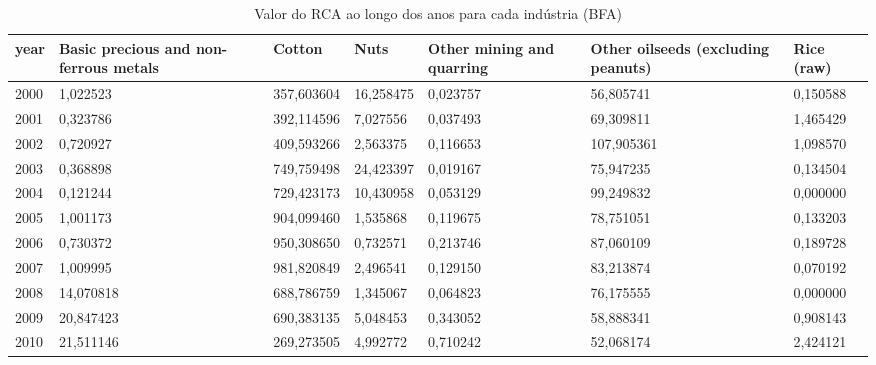 \begin{table}
\centering
\caption{Valor do RCA ao longo dos anos para cada indústria (BFA)}
\begin{tabular}{p{1cm}p{2cm}p{2cm}p{2cm}p{2cm}p{2cm}p{2cm}}
\toprule
 year &  Basic precious and non-ferrous metals &     Cotton &      Nuts &  Other mining and quarring &  Other oilseeds (excluding peanuts) &  Rice (raw) \\
\midrule
 2000 &                               1,022523 & 357,603604 & 16,258475 &                   0,023757 &                           56,805741 &    0,150588 \\
 2001 &                               0,323786 & 392,114596 &  7,027556 &                   0,037493 &                           69,309811 &    1,465429 \\
 2002 &                               0,720927 & 409,593266 &  2,563375 &                   0,116653 &                          107,905361 &    1,098570 \\
 2003 &                               0,368898 & 749,759498 & 24,423397 &                   0,019167 &                           75,947235 &    0,134504 \\
 2004 &                               0,121244 & 729,423173 & 10,430958 &                   0,053129 &                           99,249832 &    0,000000 \\
 2005 &                               1,001173 & 904,099460 &  1,535868 &                   0,119675 &                           78,751051 &    0,133203 \\
 2006 &                               0,730372 & 950,308650 &  0,732571 &                   0,213746 &                           87,060109 &    0,189728 \\
 2007 &                               1,009995 & 981,820849 &  2,496541 &                   0,129150 &                           83,213874 &    0,070192 \\
 2008 &                              14,070818 & 688,786759 &  1,345067 &                   0,064823 &                           76,175555 &    0,000000 \\
 2009 &                              20,847423 & 690,383135 &  5,048453 &                   0,343052 &                           58,888341 &    0,908143 \\
 2010 &                              21,511146 & 269,273505 &  4,992772 &                   0,710242 &                           52,068174 &    2,424121 \\

\end{tabular}
\end{table}
